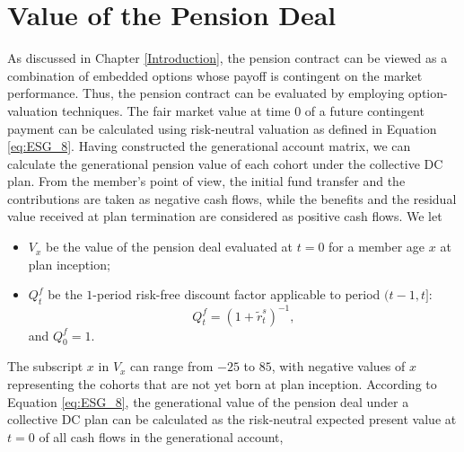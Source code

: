 \documentclass{sfuthesis}
\numberwithin{equation}{chapter}
\begin{document}
	
	\section{Value of the Pension Deal}
	\label{Value of the Pension Deal}
	
		\justify
		As discussed in Chapter \ref{Introduction}, the pension contract can be viewed as a combination of embedded options whose payoff is contingent on the market performance. Thus, the pension contract can be evaluated by employing option-valuation techniques. The fair market value at time $0$ of a future contingent payment can be calculated using risk-neutral valuation as defined in Equation \eqref{eq:ESG_8}. Having constructed the generational account matrix, we can calculate the generational pension value of each cohort under the collective DC plan. From the member's point of view, the initial fund transfer and the contributions are taken as negative cash flows, while the benefits and the residual value received at plan termination are considered as positive cash flows. We let
		\begin{itemize}
			\item $V_{x}$ be the value of the pension deal evaluated at $t=0$ for a member age $x$ at plan inception;
			\item $Q_{t}^f$ be the $1$-period risk-free discount factor applicable to period $(t-1,t]$:
			\begin{equation}
			\label{eq:VB_10}
			Q_{t}^f = (1 + \tilde{r}_{t}^s)^{-1},
			\end{equation}
			and $Q_{0}^{f} = 1.$
		\end{itemize}
		The subscript $x$ in $V_{x}$ can range from $-25$ to $85$, with negative values of $x$ representing the cohorts that are not yet born at plan inception. According to Equation \eqref{eq:ESG_8}, the generational value of the pension deal under a collective DC plan can be calculated as the risk-neutral expected present value at $t=0$ of all cash flows in the generational account,
\end{document}
